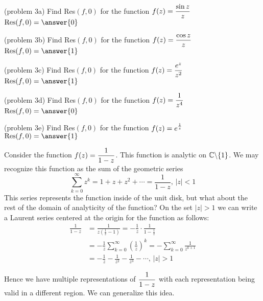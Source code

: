 \documentclass[handout]{ximera}
\begin{document}
\begin{problem}(problem 3a)
Find Res$(f, 0)$ for the function $\displaystyle f(z) = \frac{\sin z}{z}$\\
$\dis \text{Res}(f,0) = \answer{0}$
\end{problem}


\begin{problem}(problem 3b)
Find Res$(f, 0)$ for the function $\displaystyle f(z) = \frac{\cos z}{z}$\\
$\dis \text{Res}(f,0) = \answer{1}$
\end{problem}


\begin{problem}(problem 3c)
Find Res$(f, 0)$ for the function $\displaystyle f(z) = \frac{e^z}{z^2}$\\
$\dis \text{Res}(f,0) = \answer{1}$
\end{problem}


\begin{problem}(problem 3d)
Find Res$(f, 0)$ for the function $\displaystyle f(z) = \frac{1}{z^4}$\\
$\dis \text{Res}(f,0) = \answer{0}$
\end{problem}


\begin{problem}(problem 3e)
Find Res$(f, 0)$ for the function $\displaystyle f(z) = e^\frac{1}{z}$\\
$\dis \text{Res}(f,0) = \answer{1}$
\end{problem}

Consider the function $\displaystyle f(z) = \frac{1}{1-z}$. This function is analytic on $\mathbb C\backslash\{1\}$. 
We may recognize this function as the sum of the geometric series
\[
\sum_{k=0}^\infty z^k = 1+z+z^2 + \cdots = \frac{1}{1-z}, \, |z|<1
\]
This series represents the function inside of the unit disk, but what about the rest of the domain of analyticity of the function? 
On the set $|z|>1$ we can write a Laurent series centered at the origin for the function as follows:
\begin{align*}
\frac{1}{1-z} &= \frac{1}{z\left(\frac{1}{z} - 1\right)} = -\frac{1}{z}\cdot\frac{1}{1-\frac{1}{z}} \\
&= -\frac{1}{z} \sum_{k=0}^\infty \left(\frac{1}{z}\right)^k = -\sum_{k=0}^\infty \frac{1}{z^{k+1}}\\
&= -\frac{1}{z} - \frac{1}{z^2}- \frac{1}{z^3} - \cdots, \, |z|>1
\end{align*}

Hence we have multiple representations of $\displaystyle \frac{1}{1-z}$ with each representation being valid in a different region.
We can generalize this idea.
\end{document}
